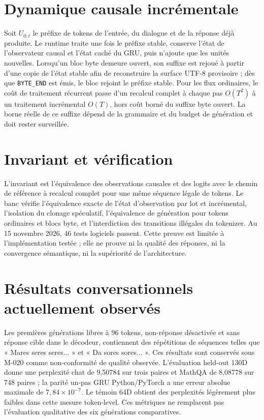 \documentclass[11pt,a4paper]{report}
\begin{document}
\section{Dynamique causale incrémentale}
Soit $U_{0:t}$ le préfixe de tokens de l'entrée, du dialogue et de la réponse déjà produite. Le runtime traite une fois le préfixe stable, conserve l'état de l'observateur causal et l'état caché du GRU, puis n'ajoute que les unités nouvelles. Lorsqu'un bloc byte demeure ouvert, son suffixe est rejoué à partir d'une copie de l'état stable afin de reconstruire la surface UTF-8 provisoire ; dès que \texttt{BYTE\_END} est émis, le bloc rejoint le préfixe stable. Pour les flux ordinaires, le coût de traitement récurrent passe d'un recalcul complet à chaque pas $O(T^2)$ à un traitement incrémental $O(T)$, hors coût borné du suffixe byte ouvert. La borne réelle de ce suffixe dépend de la grammaire et du budget de génération et doit rester surveillée.

\section{Invariant et vérification}
L'invariant est l'équivalence des observations causales et des logits avec le chemin de référence à recalcul complet pour une même séquence légale de tokens. Le banc vérifie l'équivalence exacte de l'état d'observation par lot et incrémental, l'isolation du clonage spéculatif, l'équivalence de génération pour tokens ordinaires et blocs byte, et l'interdiction des transitions illégales du tokenizer. Au 15 novembre 2026, 46 tests logiciels passent. Cette preuve est limitée à l'implémentation testée ; elle ne prouve ni la qualité des réponses, ni la convergence sémantique, ni la supériorité de l'architecture.

\section{Résultats conversationnels actuellement observés}
Les premières générations libres à 96 tokens, non-réponse désactivée et sans réponse cible dans le décodeur, contiennent des répétitions de séquences telles que « Mares seres seres... » et « Da sores sores... ». Ces résultats sont conservés sous M-020 comme non-conformité de qualité observée. L'évaluation held-out 130D donne une perplexité chat de 9,50784 sur trois paires et MathQA de 8,08778 sur 748 paires ; la parité un-pas GRU Python/PyTorch a une erreur absolue maximale de $7,84\times10^{-7}$. Le témoin 64D obtient des perplexités légèrement plus faibles dans cette mesure token-level. Ces métriques ne remplacent pas l'évaluation qualitative des six générations comparatives.
\end{document}
